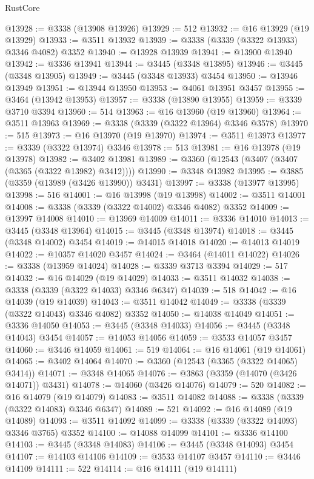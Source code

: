 \begin{lexlean}{RustCore}
\begin{coremodule}
@13928 := @3338 (@13908 @13926)
@13929 := 512
@13932 := @16 @13929 (@19 @13929)
@13933 := @3511 @13932
@13939 := @3338 (@3339 (@3322 @13933) @3346 @4082) @3352
@13940 := @13928 @13939
@13941 := @13900 @13940
@13942 := @3336 @13941
@13944 := @3445 (@3348 @13895)
@13946 := @3445 (@3348 @13905)
@13949 := @3445 (@3348 @13933) @3454
@13950 := @13946 @13949
@13951 := @13944 @13950
@13953 := @4061 @13951 @3457
@13955 := @3464 (@13942 @13953)
@13957 := @3338 (@13890 @13955)
@13959 := @3339 @3710 @3394
@13960 := 514
@13963 := @16 @13960 (@19 @13960)
@13964 := @3511 @13963
@13969 := @3338 (@3339 (@3322 @13964) @3346 @3578)
@13970 := 515
@13973 := @16 @13970 (@19 @13970)
@13974 := @3511 @13973
@13977 := @3339 (@3322 @13974) @3346
@13978 := 513
@13981 := @16 @13978 (@19 @13978)
@13982 := @3402 @13981
@13989 := @3360 (@12543 (@3407 (@3407 (@3365 (@3322 @13982) @3412))))
@13990 := @3348 @13982
@13995 := @3885 (@3359 (@13989 (@3426 @13990)) @3431)
@13997 := @3338 (@13977 @13995)
@13998 := 516
@14001 := @16 @13998 (@19 @13998)
@14002 := @3511 @14001
@14008 := @3338 (@3339 (@3322 @14002) @3346 @4082) @3352
@14009 := @13997 @14008
@14010 := @13969 @14009
@14011 := @3336 @14010
@14013 := @3445 (@3348 @13964)
@14015 := @3445 (@3348 @13974)
@14018 := @3445 (@3348 @14002) @3454
@14019 := @14015 @14018
@14020 := @14013 @14019
@14022 := @10357 @14020 @3457
@14024 := @3464 (@14011 @14022)
@14026 := @3338 (@13959 @14024)
@14028 := @3339 @3713 @3394
@14029 := 517
@14032 := @16 @14029 (@19 @14029)
@14033 := @3511 @14032
@14038 := @3338 (@3339 (@3322 @14033) @3346 @6347)
@14039 := 518
@14042 := @16 @14039 (@19 @14039)
@14043 := @3511 @14042
@14049 := @3338 (@3339 (@3322 @14043) @3346 @4082) @3352
@14050 := @14038 @14049
@14051 := @3336 @14050
@14053 := @3445 (@3348 @14033)
@14056 := @3445 (@3348 @14043) @3454
@14057 := @14053 @14056
@14059 := @3533 @14057 @3457
@14060 := @3446 @14059
@14061 := 519
@14064 := @16 @14061 (@19 @14061)
@14065 := @3402 @14064
@14070 := @3360 (@12543 (@3365 (@3322 @14065) @3414))
@14071 := @3348 @14065
@14076 := @3863 (@3359 (@14070 (@3426 @14071)) @3431)
@14078 := @14060 (@3426 @14076)
@14079 := 520
@14082 := @16 @14079 (@19 @14079)
@14083 := @3511 @14082
@14088 := @3338 (@3339 (@3322 @14083) @3346 @6347)
@14089 := 521
@14092 := @16 @14089 (@19 @14089)
@14093 := @3511 @14092
@14099 := @3338 (@3339 (@3322 @14093) @3346 @3765) @3352
@14100 := @14088 @14099
@14101 := @3336 @14100
@14103 := @3445 (@3348 @14083)
@14106 := @3445 (@3348 @14093) @3454
@14107 := @14103 @14106
@14109 := @3533 @14107 @3457
@14110 := @3446 @14109
@14111 := 522
@14114 := @16 @14111 (@19 @14111)

\end{coremodule}
\end{lexlean}
